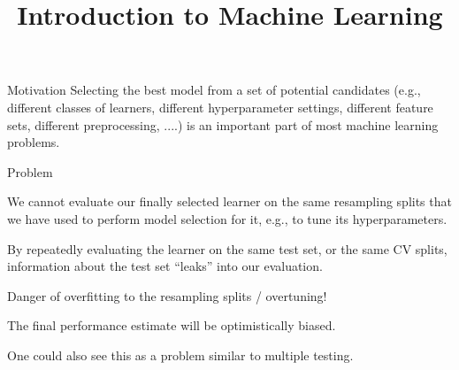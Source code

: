 \documentclass[11pt,compress,t,notes=noshow, xcolor=table]{beamer}
\title{Introduction to Machine Learning}
\begin{document}


\begin{vbframe}{Motivation}
Selecting the best model from a set of potential candidates (e.g., different classes of learners, different hyperparameter settings, different feature sets, different preprocessing, ....) is an important part of most  machine learning problems.
\vspace{-1ex}
\begin{blocki}{Problem}
    \item We cannot evaluate our finally selected learner on the same resampling splits that we have used to perform model selection for it, e.g., to tune its hyperparameters.
    \item By repeatedly evaluating the learner on the same test set, or the same CV splits, information
      about the test set \enquote{leaks} into our evaluation.
    \item Danger of overfitting to the resampling splits / overtuning!
    \item The final performance estimate will be optimistically biased.
    \item One could also see this as a problem similar to multiple testing.
\end{blocki}
\end{vbframe}
\end{document}
